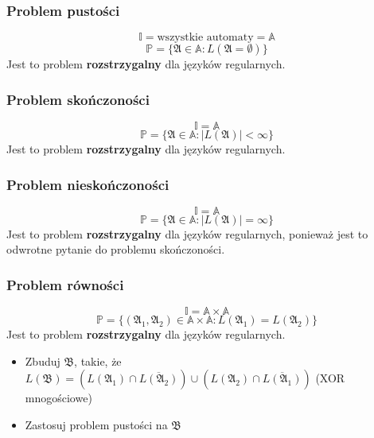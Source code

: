 \documentclass{../notatki}
\begin{document}
\subsubsection{Problem pustości}

$$
\mathbb{I} = \text{wszystkie automaty} = \mathbb{A}
$$
$$
\mathbb{P} = \{\mathfrak{A} \in \mathbb{A} : L(\mathfrak{A} = \emptyset)\}
$$
Jest to problem \textbf{rozstrzygalny} dla języków regularnych. 

\subsubsection{Problem skończoności}

$$
\mathbb{I} = \mathbb{A}
$$
$$
\mathbb{P} = \{\mathfrak{A} \in \mathbb{A} : |L(\mathfrak{A})| < \infty\}
$$
Jest to problem \textbf{rozstrzygalny} dla języków regularnych.

\subsubsection{Problem nieskończoności}

$$
\mathbb{I} = \mathbb{A}
$$
$$
\mathbb{P} = \{\mathfrak{A} \in \mathbb{A} : |L(\mathfrak{A})| = \infty\}
$$
Jest to problem \textbf{rozstrzygalny} dla języków regularnych, ponieważ jest to odwrotne pytanie do problemu skończoności.

\subsubsection{Problem równości}

$$
\mathbb{I} = \mathbb{A} \times \mathbb{A}
$$
$$
\mathbb{P} = \{(\mathfrak{A}_1, \mathfrak{A}_2) \in \mathbb{A} \times \mathbb{A} : L(\mathfrak{A}_1) = L(\mathfrak{A}_2)\}
$$
Jest to problem \textbf{rozstrzygalny} dla języków regularnych.

\begin{itemize}
    \item Zbuduj $\mathfrak{B}$, takie, że $L(\mathfrak{B}) = (L(\mathfrak{A_1}) \cap \overline{L(\mathfrak{A_2})}) \cup (L(\mathfrak{A_2}) \cap \overline{L(\mathfrak{A_1})})$ (XOR mnogościowe)
    \item Zastosuj problem pustości na $\mathfrak{B}$
\end{itemize}
\end{document}
